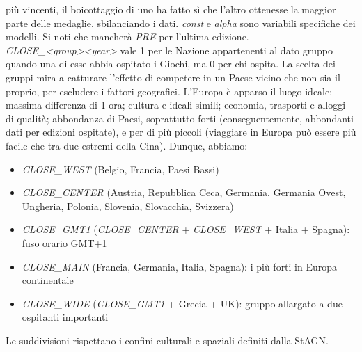 più vincenti, il boicottaggio di uno ha fatto sì che l'altro ottenesse la
maggior parte delle medaglie, sbilanciando i dati. \textit{const} e
\textit{alpha} sono variabili specifiche dei modelli.  Si noti che mancherà
\textit{PRE} per l'ultima edizione. \\
\textit{CLOSE\_<group><year>} vale 1 per le Nazione appartenenti al dato gruppo
quando una di esse abbia ospitato i Giochi, ma 0 per chi ospita. La scelta dei
gruppi mira a catturare l'effetto di competere in un Paese vicino che non sia il
proprio, per escludere i fattori geografici. L'Europa è apparso il luogo ideale:
massima differenza di 1 ora; cultura e ideali simili; economia, trasporti e
alloggi di qualità; abbondanza di Paesi, soprattutto forti (conseguentemente,
abbondanti dati per edizioni ospitate), e per di più piccoli (viaggiare in
Europa può essere più facile che tra due estremi della Cina). Dunque, abbiamo:
\begin{itemize}
    \item \textit{CLOSE\_WEST} (Belgio, Francia, Paesi Bassi)
    \item \textit{CLOSE\_CENTER} (Austria, Repubblica Ceca, Germania, Germania
    Ovest, Ungheria, Polonia, Slovenia, Slovacchia, Svizzera)
    \item \textit{CLOSE\_GMT1} (\textit{CLOSE\_CENTER} + \textit{CLOSE\_WEST} +
    Italia + Spagna): fuso orario GMT+1
    \item \textit{CLOSE\_MAIN} (Francia, Germania, Italia, Spagna): i più forti
    in Europa continentale
    \item \textit{CLOSE\_WIDE} (\textit{CLOSE\_GMT1} + Grecia + UK): gruppo
    allargato a due ospitanti importanti
\end{itemize}
Le suddivisioni rispettano i confini culturali e spaziali definiti dalla
StAGN\cite{WikipediaCentralEurope}.\\
